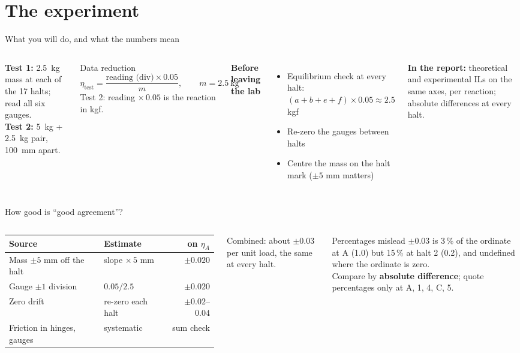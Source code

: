 \documentclass[aspectratio=169,11pt]{beamer}
\newcommand{\il}[1]{\eta_{#1}}
\begin{document}
\section{The experiment}
\begin{frame}{What you will do, and what the numbers mean}
\begin{columns}[T]
\textbf{Test 1:} \SI{2.5}{kg} mass at each of the 17 halts; read all six gauges.\\
\textbf{Test 2:} \SI{5}{kg} + \SI{2.5}{kg} pair, \SI{100}{mm} apart.
\medskip

\begin{block}{Data reduction}
\[
  \il{\text{test}} = \frac{\text{reading (div)} \times 0.05}{m}, \qquad m = 2.5~\text{kg}
\]
Test 2: reading $\times\,0.05$ is the reaction in kgf.
\end{block}
\textbf{Before leaving the lab}
\begin{itemize}
  \item Equilibrium check at every halt: $(a + b + e + f) \times 0.05 \approx 2.5$ kgf
  \item Re-zero the gauges between halts
  \item Centre the mass on the halt mark ($\pm 5$ mm matters)
\end{itemize}
\textbf{In the report:} theoretical and experimental ILs on the same axes, per reaction; absolute differences at every halt.
\end{columns}
\end{frame}

\begin{frame}{How good is ``good agreement''?}
\begin{columns}[T]
\scriptsize
\begin{tabular}{@{}p{3.2cm}p{2.1cm}r@{}}
\toprule
Source & Estimate & on $\il{A}$\\
\midrule
Mass $\pm 5$ mm off the halt & slope $\times\,5$ mm & $\pm 0.020$\\
Gauge $\pm 1$ division & $0.05/2.5$ & $\pm 0.020$\\
Zero drift & re-zero each halt & $\pm 0.02$--$0.04$\\
Friction in hinges, gauges & systematic & sum check\\
\bottomrule
\end{tabular}
\medskip

Combined: about $\pm 0.03$ per unit load, the \alert{same at every halt}.
\begin{alertblock}{Percentages mislead}
$\pm 0.03$ is 3\,\% of the ordinate at A (1.0) but 15\,\% at halt 2 (0.2), and undefined where the ordinate is zero.\\
Compare by \textbf{absolute difference}; quote percentages only at A, 1, 4, C, 5.
\end{alertblock}
\end{columns}
\end{frame}
\end{document}
